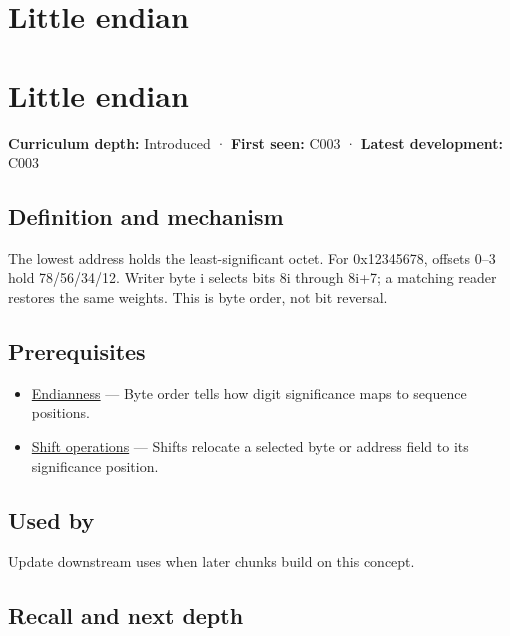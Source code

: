 \hypertarget{appendix-367b6abf460e}{}
\section*{Little endian}
\section{Little endian}\label{appendix-367b6abf460e-little-endian}

\textbf{Curriculum depth:} Introduced · \textbf{First seen:} C003 · \textbf{Latest development:} C003

\subsection{Definition and mechanism}\label{appendix-367b6abf460e-definition-and-mechanism}

The lowest address holds the least-significant octet. For 0x12345678, offsets 0--3 hold 78/56/34/12. Writer byte i selects bits 8i through 8i+7; a matching reader restores the same weights. This is byte order, not bit reversal.

\subsection{Prerequisites}\label{appendix-367b6abf460e-prerequisites}

\begin{itemize}
\tightlist
\item
  \hyperref[appendix-bc07c3d25b18]{Endianness} --- Byte order tells how digit significance maps to sequence positions.
\item
  \hyperref[appendix-73425b25118e]{Shift operations} --- Shifts relocate a selected byte or address field to its significance position.
\end{itemize}

\subsection{Used by}\label{appendix-367b6abf460e-used-by}

Update downstream uses when later chunks build on this concept.

\subsection{Recall and next depth}\label{appendix-367b6abf460e-recall-and-next-depth}

